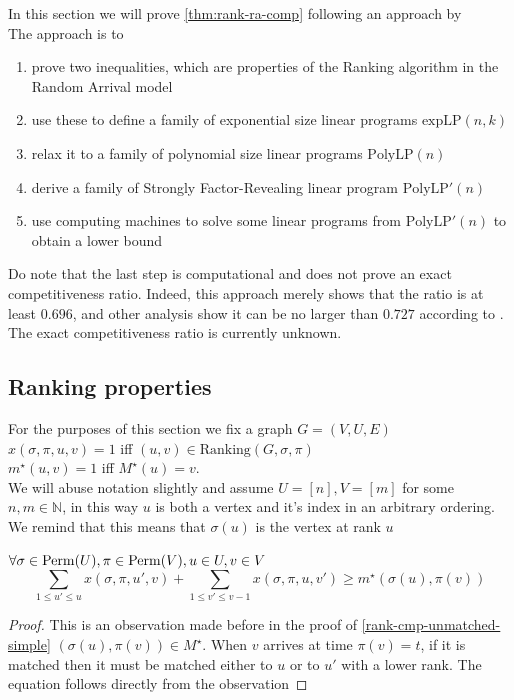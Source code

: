 In this section we will prove \autoref{thm:rank-ra-comp} following an approach by \cite{obmRaRank}\\

The approach is to
\begin{enumerate}
	\item prove two inequalities, which are properties of the Ranking algorithm in the Random Arrival model
	\item use these to define a family of exponential size linear programs $\mathrm{expLP}(n,k)$
	\item relax it to a family of polynomial size linear programs $\mathrm{PolyLP}(n)$
	\item derive a family of Strongly Factor-Revealing linear program $\mathrm{PolyLP'}(n)$
	\item use computing machines to solve some linear programs from $\mathrm{PolyLP'}(n)$ to obtain a lower bound
\end{enumerate}
Do note that the last step is computational and does not prove an exact competitiveness ratio. Indeed, this approach merely shows that the ratio is at least $0.696$, and other analysis show it can be no larger than $0.727$ according to \cite{rank-ra-upper-bound}. The exact competitiveness ratio is currently unknown.

\subsection{Ranking properties}

For the purposes of this section we fix a graph $G=(V,U,E)$\\
$x(\sigma,\pi,u,v)=1$ iff $(u,v)\in\mathrm{Ranking}(G,\sigma,\pi)$\\
$m^\star(u,v)=1$ iff $M^\star(u)=v$.\\
We will abuse notation slightly and assume $U=[n],V=[m]$ for some $n,m\in\mathbb{N}$, in this way $u$ is both a vertex and it's index in an arbitrary ordering. We remind that this means that $\sigma(u)$ is the vertex at rank $u$

\begin{lemma}[Dominance]
	$\forall \sigma\in\mathrm{Perm}(U),\pi\in\mathrm{Perm}(V),u\in U,v\in V$
	\begin{equation}
		\label{ra-rank-eq1}
		\sum\limits_{1\leq u'\leq u} x(\sigma,\pi,u',v)+\sum\limits_{1\leq v'\leq v-1} x(\sigma,\pi,u,v')\geq m^\star(\sigma(u),\pi(v))
	\end{equation}
\end{lemma}
\begin{proof}
	This is an observation made before in the proof of \autoref{rank-cmp-unmatched-simple}
	$(\sigma(u),\pi(v))\in M^\star$. When $v$ arrives at time $\pi(v)=t$, if it is matched then it must be matched either to $u$ or to $u'$ with a lower rank. The equation follows directly from the observation 
\end{proof}

